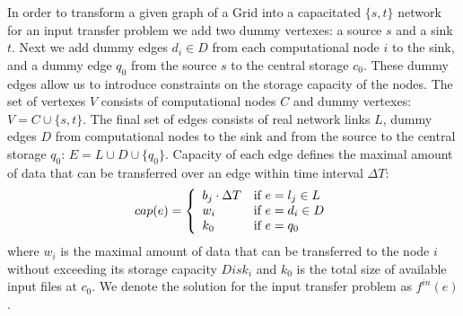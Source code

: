 \documentclass[english]{ddny}
\begin{document}
In order to transform a given graph of a Grid into a capacitated $\{s,t\}$
network for an input transfer problem we add two dummy vertexes: a source $s$
and a sink $t$. Next we add  dummy edges $d_{i} \in D$ from each computational
node $i$ to the sink, and a dummy edge $q_{0}$ from the source $s$ to the
central storage $c_{0}$. These dummy edges allow us to introduce constraints
on the storage capacity of the nodes. The set of vertexes $V$ consists of
computational nodes $C$ and dummy vertexes: $V= C \cup \{s,t\}$. The final set
of edges consists of real network links $L$, dummy edges $D$ from
computational nodes to the sink and from the source to the central storage
$q_{0}$: $E= L \cup D \cup \{q_{0}\}$. Capacity of each edge defines the
maximal amount of data that can be transferred over an edge within time
interval $\Delta T$: 
%
\begin{equation} 
\label{edge_cap} 
cap(e) = \left\{
\begin{array}{l l} 
b_{j} \cdot \Delta T & \text{if }e = l_{j} \in L \\ w_{i} &
\text{if } e = d_{i} \in D\\ k_{0} & \text{if } e = q_{0} 
\end{array} \right.
\end{equation} 
%
where $w_{i}$ is the maximal amount of data that can be
transferred to the node $i$ without exceeding its storage capacity $Disk_{i}$
and $k_{0}$ is the total size of available input files at $c_{0}$. We denote
the solution for the input transfer problem as $f^{in}(e)$.
\end{document}
